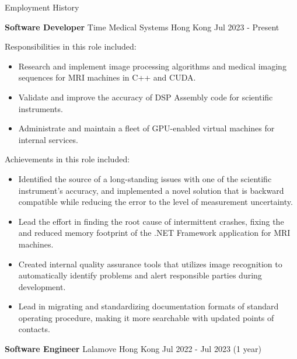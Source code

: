 \documentclass{resume} %
\begin{document}

\begin{rSection}{Employment History}
    \vspace{-1.25em}
    \item \textbf{Software Developer} {Time Medical Systems Hong Kong}
    \hfill Jul 2023 - Present\\
    
    \hspace*{1cm}%
    \begin{minipage}{.8\textwidth}%
        Responsibilities in this role included:
        \begin{itemize}
            \item Research and implement image processing algorithms and medical imaging sequences for MRI machines in C++ and CUDA.
            \item Validate and improve the accuracy of DSP Assembly code for scientific instruments.
            \item Administrate and maintain a fleet of GPU-enabled virtual machines for internal services.
        \end{itemize}
        
        Achievements in this role included:
        \begin{itemize}
            \item Identified the source of a long-standing issues with one of the scientific instrument's accuracy, and implemented a novel solution that is backward compatible while reducing the error to the level of measurement uncertainty.
            \item Lead the effort in finding the root cause of intermittent crashes, fixing the and reduced memory footprint of the .NET Framework application for MRI machines.
            \item Created internal quality assurance tools that utilizes image recognition to automatically identify problems and alert responsible parties during development.
            \item Lead in migrating and standardizing documentation formats of standard operating procedure, making it more searchable with updated points of contacts.
        \end{itemize}
    \end{minipage}%
    
    \item \textbf{Software Engineer} {Lalamove Hong Kong} \hfill Jul 2022 - Jul 2023 (1 year)\\
    

\end{rSection}
\end{document}
